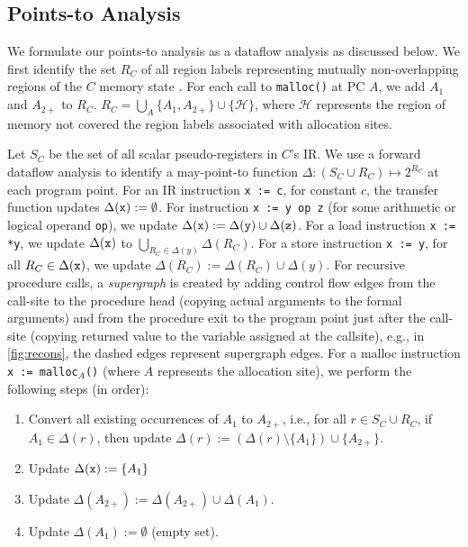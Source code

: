 \subsection{Points-to Analysis}
\label{sec:pointsToFormal}
We formulate our points-to analysis as a dataflow analysis as discussed below.
We first identify the set $R_C$ of all region labels representing mutually non-overlapping
regions of the $C$ memory state \mem{}.
For each call to {\tt malloc()} at PC $A$, we add $A_1$ and $A_{2+}$ to $R_C$. $R_C=\bigcup_{A}\{A_1,A_{2+}\}\cup\{ \mathcal{H} \}$,
where $\mathcal{H}$ represents the region of memory \mem{} not covered the region labels associated with allocation sites.

Let $S_{C}$ be the set of all scalar pseudo-registers in $C$'s
IR. We use a forward dataflow
analysis to identify a may-point-to function $\Delta: (S_{C}\cup{}R_C) \mapsto 2^{R_C}$
at each program point.
For an IR instruction {\tt x := c}, for constant $c$, the
transfer function updates $\Delta({\tt x}) := \emptyset$.
For instruction {\tt x := y op z} (for some arithmetic
or logical operand {\tt op}),
we update $\Delta({\tt x}) := \Delta({\tt y})\cup\Delta({\tt z})$.
For a
load instruction {\tt x := *y}, we
update $\Delta({\tt x})$ to $\bigcup_{R_C\in\Delta(y)}\Delta(R_C)$.
For a store instruction {\tt *x := y}, for all
$R_C\in\Delta({\tt x})$, we update $\Delta(R_C) := \Delta(R_C)\cup\Delta(y)$.
For recursive procedure calls, a {\em supergraph}
is created by adding control flow edges
from the call-site to the procedure head (copying actual arguments
to the formal arguments) and from the procedure exit
to the program point just after the call-site (copying returned
value to the variable assigned at the callsite), e.g., in
\cref{fig:recons}, the dashed edges
represent supergraph edges.
For a malloc instruction {\tt x := malloc$_A$()} (where $A$
represents the allocation site), we perform the following steps (in order):
\begin{enumerate}
\item Convert all existing occurrences of $A_1$ to $A_{2+}$, i.e., for all $r\in{}S_C\cup{}R_C$, if $A_1\in\Delta(r)$, then update $\Delta(r) := (\Delta(r)\setminus\{A_1\})\cup\{A_{2+}\}$.
\item Update $\Delta({\tt x}) := \{A_1\}$
\item Update $\Delta(A_{2+}) := \Delta(A_{2+})\cup\Delta(A_1)$.
\item Update $\Delta(A_1) := \emptyset$ (empty set).
\end{enumerate}

